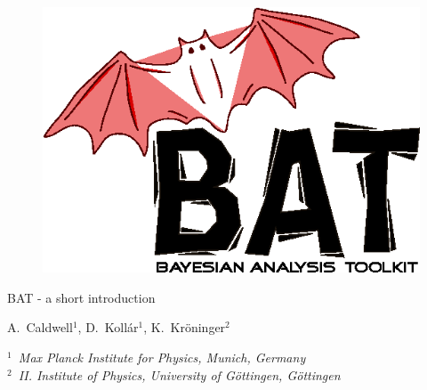 \documentclass[11pt, a4paper]{article}
\begin{document}

\thispagestyle{empty} 

\begin{figure}
\includegraphics[scale=0.25]{bat.png} 
\end{figure} 

\vspace{1.0cm}

\begin{center}

{\Large {\sc BAT} - a short introduction} 

\vspace{1.0cm}

{A.~Caldwell$^{1}$, D.~Koll\'ar${^1}$, K.~Kr\"oninger$^{2}$}

\vspace{1.0cm}

{\it $^{1}$~Max Planck Institute for Physics, Munich, Germany \\ 
$^{2}$~II. Institute of Physics, University of G\"ottingen, G\"ottingen }
\end{center}

\thispagestyle{empty} 

\pagebreak 


\thispagestyle{empty} 

\tableofcontents

\pagebreak 
\end{document}
